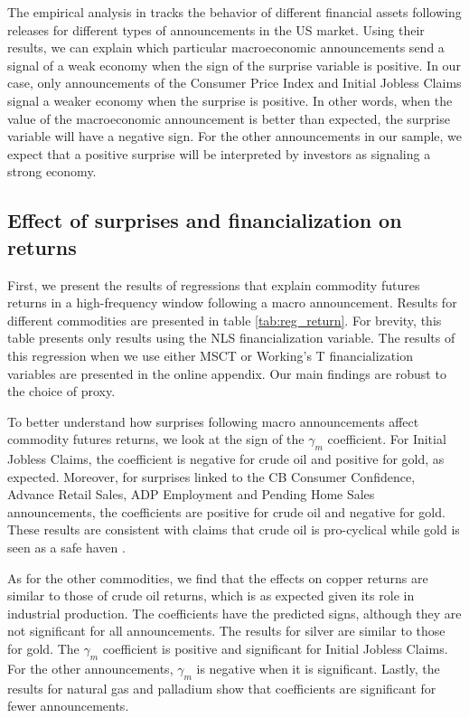 \documentclass[12pt]{article}
\begin{document}
The empirical analysis in  \citet*{boehm2020us} tracks the behavior of different financial assets following releases for different types of announcements in the US market. Using their results, we can explain which particular macroeconomic announcements send a signal of a weak economy when the sign of the surprise variable is positive. In our case, only announcements of the Consumer Price Index \citep*{bryan1993consumer,clark1997us} and Initial Jobless Claims \citep*{fleming1997moves,fleming1999price,getz1990barometer} signal a weaker economy when the surprise is positive. In other words, when the value of the macroeconomic announcement is better than expected, the surprise variable will have a negative sign. For the other announcements in our sample, we expect that a positive surprise will be interpreted by investors as signaling a strong economy. %

 
 
 
 


\subsection{Effect of surprises and financialization on returns}
First, we present the results of regressions that explain commodity futures returns in a high-frequency window following a macro announcement. Results for different commodities are presented in table \ref{tab:reg_return}. For brevity, this table presents only results using the NLS financialization variable. The results of this regression when we use either MSCT or Working’s T financialization variables are presented in the online appendix. Our main findings are robust to the choice of proxy.


To better understand how surprises following macro announcements affect commodity futures returns, we look at the sign of the $\gamma_m$ coefficient.  For Initial Jobless Claims, the coefficient is negative for crude oil and positive for gold, as expected. Moreover, for surprises linked to the CB Consumer Confidence, Advance Retail Sales, ADP Employment and Pending Home Sales announcements, the coefficients are positive for crude oil and negative for gold. These results are consistent with claims that crude oil is pro-cyclical while gold is seen as a safe haven \citep[see e.g.,][]{lucey2015precious}. 

As for the other commodities, we find that the effects on copper returns are similar to those of crude oil returns, which is as expected given its role in industrial production. The coefficients have the predicted signs, although they are not significant for all announcements. The results for silver are similar to those for gold. The $\gamma_m$ coefficient is positive and significant for Initial Jobless Claims. For the other announcements, $\gamma_m$ is negative when it is significant. Lastly, the results for natural gas and palladium show that coefficients are significant for fewer announcements. 
\end{document}
